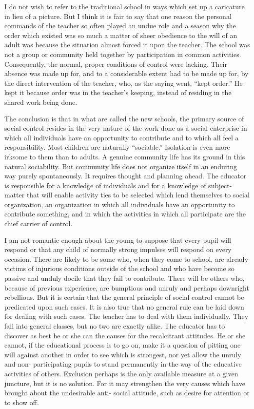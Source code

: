 I do not wish to refer to the traditional school in ways which set up a caricature in lieu 
of a picture. But I think it is fair to say that one reason the personal commands of the 
teacher so often played an undue role and a season why the order which existed was so 
much a matter of sheer obedience to the will of an adult was because the situation almost 
forced it upon the teacher. The school was not a group or community held together by 
participation in common activities. Consequently, the normal, proper conditions of 
control were lacking. Their absence was made up for, and to a considerable extent had to 
be made up for, by the direct intervention of the teacher, who, as the saying went, \enquote{kept 
order.} He kept it because order was in the teacher's keeping, instead of residing in the 
shared work being done. 

The conclusion is that in what are called the new schools, the primary source of social 
control resides in the very nature of the work done as a social enterprise in which all 
individuals have an opportunity to contribute and to which all feel a responsibility. Most 
children are naturally \enquote{sociable.} Isolation is even more irksome to them than to adults. A 
genuine community life has its ground in this natural sociability. But community life does 
not organize itself in an enduring way purely spontaneously. It requires thought and 
planning ahead. The educator is responsible for a knowledge of individuals and for a 
knowledge of subject-matter that will enable activity ties to be selected which lend 
themselves to social organization, an organization in which all individuals have an opportunity to contribute something, and in which the activities in which all participate 
are the chief carrier of control. 

I am not romantic enough about the young to suppose that every pupil will respond or 
that any child of normally strong impulses will respond on every occasion. There are 
likely to be some who, when they come to school, are already victims of injurious 
conditions outside of the school and who have become so passive and unduly docile that 
they fail to contribute. There will be others who, because of previous experience, are 
bumptious and unruly and perhaps downright rebellious. But it is certain that the general 
principle of social control cannot be predicated upon such cases. It is also true that no 
general rule can be laid down for dealing with such cases. The teacher has to deal with 
them individually. They fall into general classes, but no two are exactly alike. The 
educator has to discover as best he or she can the causes for the recalcitrant attitudes. He 
or she cannot, if the educational process is to go on, make it a question of pitting one will 
against another in order to see which is strongest, nor yet allow the unruly and non- 
participating pupils to stand permanently in the way of the educative activities of others. 
Exclusion perhaps is the only available measure at a given juncture, but it is no solution. 
For it may strengthen the very causes which have brought about the undesirable anti- 
social attitude, such as desire for attention or to show off. 

